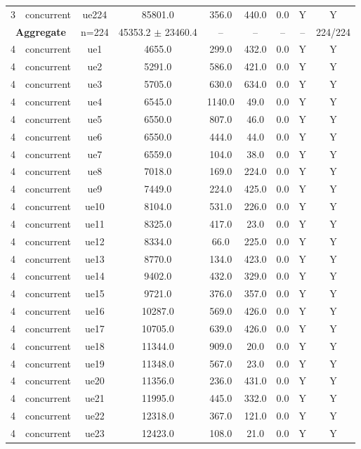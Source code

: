 \begin{table}[ht]
\begin{tabular}{|c|c|c|c|c|c|c|c|c|}
3 & concurrent & ue224 & 85801.0 & 356.0 & 440.0 & 0.0 & Y & Y \\
\multicolumn{2}{|c|}{\textbf{Aggregate}} & n=224 & 45353.2 $\pm$ 23460.4 & -- & -- & -- & -- & 224/224 \\
\hline
4 & concurrent & ue1 & 4655.0 & 299.0 & 432.0 & 0.0 & Y & Y \\
4 & concurrent & ue2 & 5291.0 & 586.0 & 421.0 & 0.0 & Y & Y \\
4 & concurrent & ue3 & 5705.0 & 630.0 & 634.0 & 0.0 & Y & Y \\
4 & concurrent & ue4 & 6545.0 & 1140.0 & 49.0 & 0.0 & Y & Y \\
4 & concurrent & ue5 & 6550.0 & 807.0 & 46.0 & 0.0 & Y & Y \\
4 & concurrent & ue6 & 6550.0 & 444.0 & 44.0 & 0.0 & Y & Y \\
4 & concurrent & ue7 & 6559.0 & 104.0 & 38.0 & 0.0 & Y & Y \\
4 & concurrent & ue8 & 7018.0 & 169.0 & 224.0 & 0.0 & Y & Y \\
4 & concurrent & ue9 & 7449.0 & 224.0 & 425.0 & 0.0 & Y & Y \\
4 & concurrent & ue10 & 8104.0 & 531.0 & 226.0 & 0.0 & Y & Y \\
4 & concurrent & ue11 & 8325.0 & 417.0 & 23.0 & 0.0 & Y & Y \\
4 & concurrent & ue12 & 8334.0 & 66.0 & 225.0 & 0.0 & Y & Y \\
4 & concurrent & ue13 & 8770.0 & 134.0 & 423.0 & 0.0 & Y & Y \\
4 & concurrent & ue14 & 9402.0 & 432.0 & 329.0 & 0.0 & Y & Y \\
4 & concurrent & ue15 & 9721.0 & 376.0 & 357.0 & 0.0 & Y & Y \\
4 & concurrent & ue16 & 10287.0 & 569.0 & 426.0 & 0.0 & Y & Y \\
4 & concurrent & ue17 & 10705.0 & 639.0 & 426.0 & 0.0 & Y & Y \\
4 & concurrent & ue18 & 11344.0 & 909.0 & 20.0 & 0.0 & Y & Y \\
4 & concurrent & ue19 & 11348.0 & 567.0 & 23.0 & 0.0 & Y & Y \\
4 & concurrent & ue20 & 11356.0 & 236.0 & 431.0 & 0.0 & Y & Y \\
4 & concurrent & ue21 & 11995.0 & 445.0 & 332.0 & 0.0 & Y & Y \\
4 & concurrent & ue22 & 12318.0 & 367.0 & 121.0 & 0.0 & Y & Y \\
4 & concurrent & ue23 & 12423.0 & 108.0 & 21.0 & 0.0 & Y & Y \\

\end{tabular}
\end{table}
